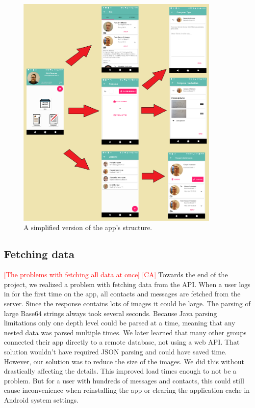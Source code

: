 \documentclass[acmlarge, review=false, screen=true]{acmart}
\begin{document}
      \begin{figure}
        \includegraphics[width=10cm]{images/Simplified_structure.png}
        \caption{A simplified version of the app’s structure.}
        \label{fig:simplified-nav}
      \end{figure}
    \subsection{Fetching data}
      \textcolor{red}{[The problems with fetching all data at once] [CA]} \newline
      Towards the end of the project, we realized a problem with fetching data from the API. When a user logs in for the first time on the app, all contacts and messages are fetched from the server. Since the response contains lots of images it could be large. The parsing of large Base64 strings always took several seconds. Because Java parsing limitations only one depth level could be parsed at a time, meaning that any nested data was parsed multiple times. We later learned that many other groups connected their app directly to a remote database, not using a web API. That solution wouldn’t have required JSON parsing and could have saved time. However, our solution was to reduce the size of the images. We did this without drastically affecting the details. This improved load times enough to not be a problem. But for a user with hundreds of messages and contacts, this could still cause inconvenience when reinstalling the app or clearing the application cache in Android system settings.
\end{document}
